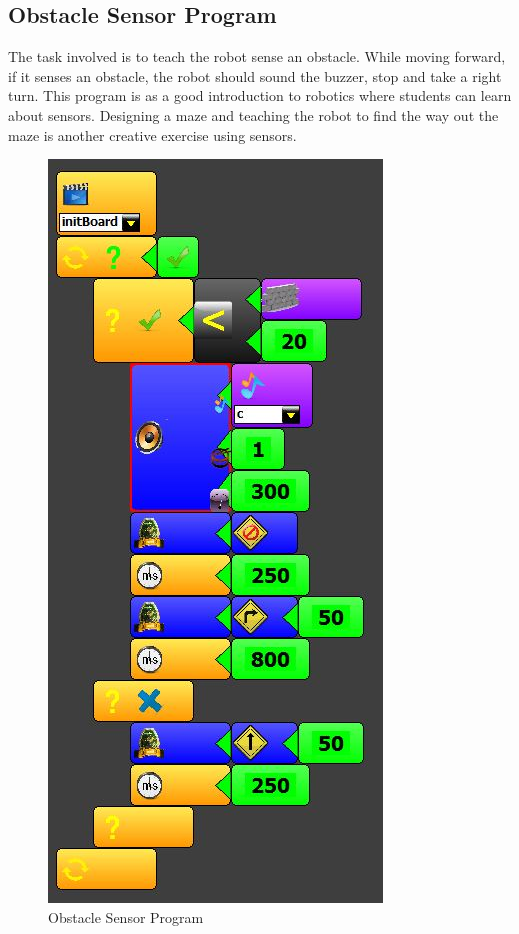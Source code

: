 \documentclass[conference]{IEEEtran}
\begin{document}
\subsection{Obstacle Sensor Program}

The task involved is to teach the robot sense an obstacle. While moving forward, if it senses an obstacle, the robot should sound the buzzer, stop and take a right turn. This program is as a good introduction to robotics where students can learn about sensors. Designing a maze and teaching the robot to find the way out the maze is another creative exercise using sensors.

\begin{figure}[h]
\centering
\includegraphics[scale=0.5]{Fig_14.png}
\caption{Obstacle Sensor Program}
\end{figure}
\end{document}
